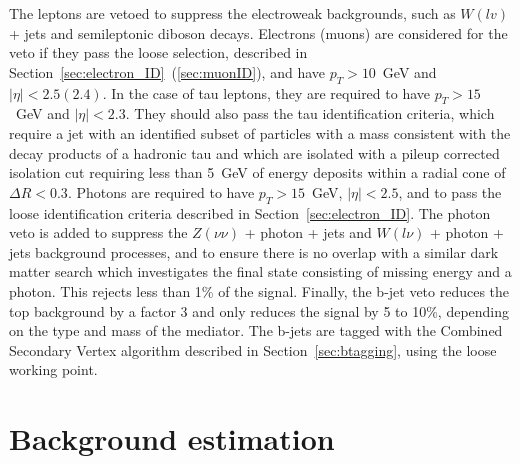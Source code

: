 The leptons are vetoed to suppress the electroweak backgrounds, such as $W(lv)$ + jets and semileptonic diboson decays. Electrons (muons) are considered for the veto if they pass the loose selection, described in Section~\ref{sec:electron_ID}~(\ref{sec:muonID}), and have $p_T > 10$~GeV and $|\eta| < 2.5 (2.4)$. In the case of tau leptons, they are required to have $p_T > 15$~GeV and $|\eta| < 2.3$. They should also pass the tau identification criteria, which require a jet with an identified subset of particles with a mass consistent with the decay products of a hadronic tau and which are isolated with a pileup corrected isolation cut requiring less than 5~GeV of energy deposits within a radial cone of $\Delta R < 0.3$. Photons are required to have $p_T > 15$~GeV, $|\eta| < 2.5$, and to pass the loose identification criteria described in Section~\ref{sec:electron_ID}. The photon veto is added to suppress the $Z(\nu\nu)$ + photon + jets and $W(l\nu)$ + photon + jets background processes, and to ensure there is no overlap with a similar dark matter search which investigates the final state consisting of missing energy and a photon. This rejects less than 1\% of the signal. Finally, the b-jet veto reduces the top background by a factor 3 and only reduces the signal by 5 to 10\%, depending on the type and mass of the mediator. The b-jets are tagged with the Combined Secondary Vertex algorithm described in Section~\ref{sec:btagging}, using the loose working point.

\section{Background estimation}
\label{sec:bkgd}

% 
% 
% 
% 

